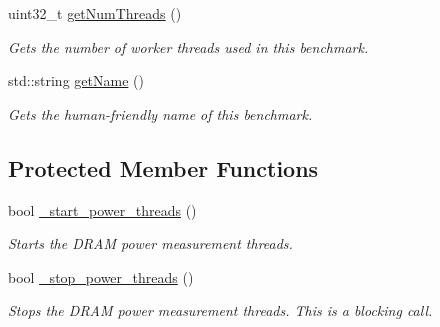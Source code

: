 \begin{DoxyCompactItemize}
uint32\+\_\+t \hyperlink{classxmem_1_1benchmark_1_1_benchmark_ad38e0629d25ae4177d4915f1aafd65f1}{get\+Num\+Threads} ()
\begin{DoxyCompactList}\small\item\em Gets the number of worker threads used in this benchmark. \end{DoxyCompactList}\item 
std\+::string \hyperlink{classxmem_1_1benchmark_1_1_benchmark_a18883dec146e768436c35946d40ab659}{get\+Name} ()
\begin{DoxyCompactList}\small\item\em Gets the human-\/friendly name of this benchmark. \end{DoxyCompactList}\end{DoxyCompactItemize}
\subsection*{Protected Member Functions}
\begin{DoxyCompactItemize}
\item 
bool \hyperlink{classxmem_1_1benchmark_1_1_benchmark_aaab5c124256e59540e061533323c64d7}{\+\_\+start\+\_\+power\+\_\+threads} ()
\begin{DoxyCompactList}\small\item\em Starts the D\+R\+A\+M power measurement threads. \end{DoxyCompactList}\item 
bool \hyperlink{classxmem_1_1benchmark_1_1_benchmark_a1c485c6f7fb6bbde588220d12129fa8e}{\+\_\+stop\+\_\+power\+\_\+threads} ()
\begin{DoxyCompactList}\small\item\em Stops the D\+R\+A\+M power measurement threads. This is a blocking call. \end{DoxyCompactList}\end{DoxyCompactItemize}
